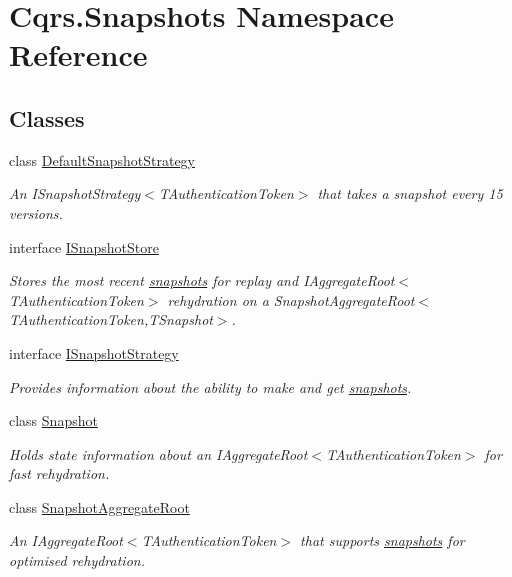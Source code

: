 \hypertarget{namespaceCqrs_1_1Snapshots}{}\section{Cqrs.\+Snapshots Namespace Reference}
\label{namespaceCqrs_1_1Snapshots}
\subsection*{Classes}
\begin{DoxyCompactItemize}
\item 
class \hyperlink{classCqrs_1_1Snapshots_1_1DefaultSnapshotStrategy}{Default\+Snapshot\+Strategy}
\begin{DoxyCompactList}\small\item\em An I\+Snapshot\+Strategy$<$\+T\+Authentication\+Token$>$ that takes a snapshot every 15 versions. \end{DoxyCompactList}\item 
interface \hyperlink{interfaceCqrs_1_1Snapshots_1_1ISnapshotStore}{I\+Snapshot\+Store}
\begin{DoxyCompactList}\small\item\em Stores the most recent \hyperlink{classCqrs_1_1Snapshots_1_1Snapshot}{snapshots} for replay and I\+Aggregate\+Root$<$\+T\+Authentication\+Token$>$ rehydration on a Snapshot\+Aggregate\+Root$<$\+T\+Authentication\+Token,\+T\+Snapshot$>$. \end{DoxyCompactList}\item 
interface \hyperlink{interfaceCqrs_1_1Snapshots_1_1ISnapshotStrategy}{I\+Snapshot\+Strategy}
\begin{DoxyCompactList}\small\item\em Provides information about the ability to make and get \hyperlink{classCqrs_1_1Snapshots_1_1Snapshot}{snapshots}. \end{DoxyCompactList}\item 
class \hyperlink{classCqrs_1_1Snapshots_1_1Snapshot}{Snapshot}
\begin{DoxyCompactList}\small\item\em Holds state information about an I\+Aggregate\+Root$<$\+T\+Authentication\+Token$>$ for fast rehydration. \end{DoxyCompactList}\item 
class \hyperlink{classCqrs_1_1Snapshots_1_1SnapshotAggregateRoot}{Snapshot\+Aggregate\+Root}
\begin{DoxyCompactList}\small\item\em An I\+Aggregate\+Root$<$\+T\+Authentication\+Token$>$ that supports \hyperlink{classCqrs_1_1Snapshots_1_1Snapshot}{snapshots} for optimised rehydration. \end{DoxyCompactList}\item 

\end{DoxyCompactItemize}
